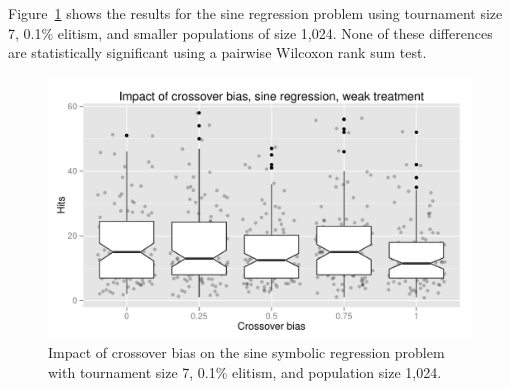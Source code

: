 \documentclass{sig-alternate}
\begin{document}
%
%
%
%

%
%
%
%

Figure~\ref{fig:sineBiasResultsWeak} shows the results for the sine regression problem using tournament size 7, 0.1\% 
elitism, and smaller populations  of size 1,024. None of these differences are statistically significant using a 
pairwise Wilcoxon rank sum test.

\begin{figure}
\centering
\includegraphics[width=0.45 \textwidth]{Plots/Sine_XO_impact_weak_boxplot.pdf}
\caption{Impact of crossover bias on the sine symbolic regression problem with tournament size 7, 0.1\% elitism, and 
population size 1,024.}
\label{fig:sineBiasResultsWeak}
\end{figure}
\end{document}

